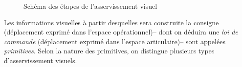 \begin{figure}[htp]
  \centering
    \def\svgwidth{.95\linewidth}
  
    \caption{\footnotesize{Schéma des étapes de l'asservissement visuel}}
\label{chap01:fig05}
\end{figure}

Les informations visuelles \`a partir desquelles sera construite la consigne 
(d\'eplacement exprim\'e dans l'espace op\'erationnel)-- dont on d\'eduira une 
{\it loi de commande} (d\'eplacement exprim\'e dans l'espace articulaire)-- sont 
appel\'ees {\it pri\-mitives}. Selon la nature des primitives, on distingue 
plusieurs types d'asservis\-sement visuels.\\

\\

